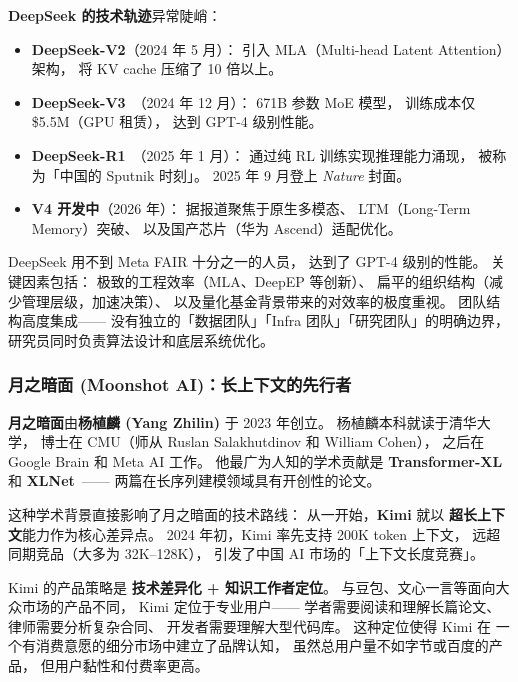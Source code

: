 \textbf{DeepSeek 的技术轨迹}异常陡峭：
\begin{itemize}[noitemsep]
  \item \textbf{DeepSeek-V2}（2024 年 5 月）：
        引入 MLA（Multi-head Latent Attention）架构，
        将 KV cache 压缩了 10 倍以上。
  \item \textbf{DeepSeek-V3}~\cite{deepseekv3}（2024 年 12 月）：
        671B 参数 MoE 模型，
        训练成本仅 \$5.5M（GPU 租赁），
        达到 GPT-4 级别性能。
  \item \textbf{DeepSeek-R1}~\cite{deepseekr1}（2025 年 1 月）：
        通过纯 RL 训练实现推理能力涌现，
        被称为「中国的 Sputnik 时刻」。
        2025 年 9 月登上 \textit{Nature} 封面。
  \item \textbf{V4 开发中}（2026 年）：
        据报道聚焦于原生多模态、
        LTM（Long-Term Memory）突破、
        以及国产芯片（华为 Ascend）适配优化。
\end{itemize}

DeepSeek 用不到 Meta FAIR 十分之一的人员，
达到了 GPT-4 级别的性能。
关键因素包括：
极致的工程效率（MLA、DeepEP 等创新）、
扁平的组织结构（减少管理层级，加速决策）、
以及量化基金背景带来的对效率的极度重视。
团队结构高度集成——
没有独立的「数据团队」「Infra 团队」「研究团队」的明确边界，
研究员同时负责算法设计和底层系统优化。

\subsubsection{月之暗面 (Moonshot AI)：长上下文的先行者}

\textbf{月之暗面}由\textbf{杨植麟 (Yang Zhilin)} 于 2023 年创立。
杨植麟本科就读于清华大学，
博士在 CMU（师从 Ruslan Salakhutdinov 和 William Cohen），
之后在 Google Brain 和 Meta AI 工作。
他最广为人知的学术贡献是
\textbf{Transformer-XL}~\cite{dai2019transformerxl}
和 \textbf{XLNet}~\cite{yang2019xlnet}——
两篇在长序列建模领域具有开创性的论文。

这种学术背景直接影响了月之暗面的技术路线：
从一开始，\textbf{Kimi} 就以
\textbf{超长上下文}能力作为核心差异点。
2024 年初，Kimi 率先支持 200K token 上下文，
远超同期竞品（大多为 32K--128K），
引发了中国 AI 市场的「上下文长度竞赛」。

Kimi 的产品策略是
\textbf{技术差异化 + 知识工作者定位}。
与豆包、文心一言等面向大众市场的产品不同，
Kimi 定位于专业用户——
学者需要阅读和理解长篇论文、
律师需要分析复杂合同、
开发者需要理解大型代码库。
这种定位使得 Kimi 在
一个有消费意愿的细分市场中建立了品牌认知，
虽然总用户量不如字节或百度的产品，
但用户黏性和付费率更高。

